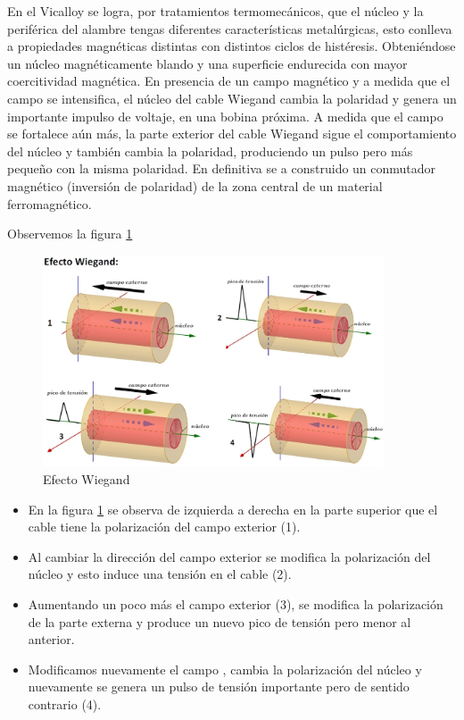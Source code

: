 En el Vicalloy se logra, por tratamientos termomecánicos, que el núcleo y la periférica del alambre tengas diferentes características metalúrgicas, esto conlleva a propiedades magnéticas distintas con distintos ciclos de histéresis. Obteniéndose un núcleo magnéticamente blando y una superficie endurecida con mayor coercitividad magnética. En presencia de un campo magnético y a medida que el campo se intensifica, el núcleo del cable Wiegand cambia la polaridad y genera un importante impulso de voltaje, en una bobina próxima. A medida que el campo se fortalece aún más, la parte exterior del cable Wiegand sigue el comportamiento del núcleo y también cambia la polaridad, produciendo un pulso pero más pequeño con la misma polaridad. En definitiva se a construido un conmutador magnético (inversión de polaridad) de la zona central de un material ferromagnético.

Observemos la figura \ref{fig:efectoWiegand}


\begin{figure}[H]
    \centering
    \includegraphics[width=0.9\textwidth]{./Figures/efectoWiegand}
	\caption{Efecto Wiegand}
	\label{fig:efectoWiegand}
\end{figure}

\begin{itemize}
	\item En la figura \ref{fig:efectoWiegand} se observa de izquierda a derecha en la parte superior que el cable tiene la polarización del campo exterior (1).

	\item Al cambiar la dirección del campo exterior se modifica la polarización del núcleo y esto induce una tensión en el cable (2).
	
	\item Aumentando un poco más el campo exterior (3), se modifica la polarización de la parte externa y produce un nuevo pico de tensión pero menor al anterior.
	
	\item Modificamos nuevamente el campo , cambia la polarización del núcleo y nuevamente se genera un pulso de tensión importante pero de sentido contrario (4).

\end{itemize}

